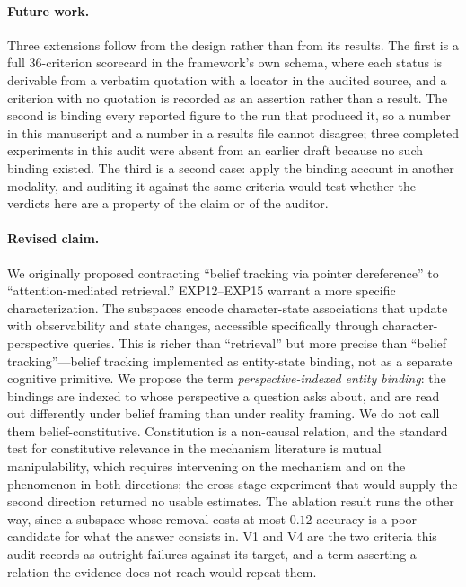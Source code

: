 \documentclass{article}
\begin{document}
\paragraph{Future work.}
Three extensions follow from the design rather than from its results. The first is a full
36-criterion scorecard in the framework's own schema, where each status is derivable from a
verbatim quotation with a locator in the audited source, and a criterion with no quotation is
recorded as an assertion rather than a result. The second is binding every reported figure to
the run that produced it, so a number in this manuscript and a number in a results file
cannot disagree; three completed experiments in this audit were absent from an earlier draft
because no such binding existed. The third is a second case: \citet{cui2026dual} apply the
binding account in another modality, and auditing it against the same criteria would test
whether the verdicts here are a property of the claim or of the auditor.

\paragraph{Revised claim.}
We originally proposed contracting ``belief tracking via pointer dereference'' to ``attention-mediated retrieval.'' EXP12--EXP15 warrant a more specific characterization. The subspaces encode character-state associations that update with observability and state changes, accessible specifically through character-perspective queries. This is richer than ``retrieval'' but more precise than ``belief tracking''---belief tracking implemented as entity-state binding, not as a separate cognitive primitive. We propose the term \emph{perspective-indexed entity binding}: the bindings are indexed to
whose perspective a question asks about, and are read out differently under belief framing
than under reality framing. We do not call them belief-constitutive. Constitution is a
non-causal relation, and the standard test for constitutive relevance in the mechanism
literature is mutual manipulability, which requires intervening on the mechanism and on the
phenomenon in both directions; the cross-stage experiment that would supply the second
direction returned no usable estimates. The ablation result runs the other way, since a
subspace whose removal costs at most $0.12$ accuracy is a poor candidate for what the answer
consists in. V1 and V4 are the two criteria this audit records as outright failures against
its target, and a term asserting a relation the evidence does not reach would repeat them.
\end{document}
